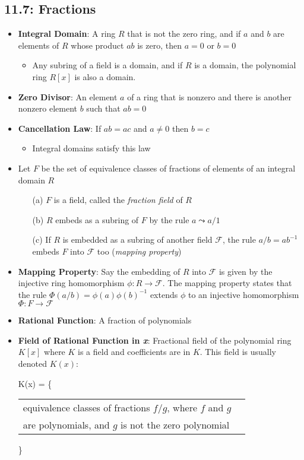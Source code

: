 \documentclass[12pt]{article}
\begin{document}
\subsection*{11.7: Fractions}
\begin{itemize}
  \item \textbf{Integral Domain}: A ring $R$ that is not the zero ring, and if $a$ and $b$ are elements of $R$ whose product $ab$ is zero, then $a = 0$ or $b = 0$
  \begin{itemize}
    \item Any subring of a field is a domain, and if $R$ is a domain, the polynomial ring $R[x]$ is also a domain.
  \end{itemize}
  \item \textbf{Zero Divisor}: An element $a$ of a ring that is nonzero and there is another nonzero element $b$ such that $ab = 0$
  \item \textbf{Cancellation Law}: If $ab = ac$ and $a \neq 0$ then $b = c$
  \begin{itemize}
    \item Integral domains satisfy this law
  \end{itemize}
  \item Let $F$ be the set of equivalence classes of fractions of elements of an integral domain $R$
  \begin{enumerate}
    \item[(a)] $F$ is a field, called the \textit{fraction field} of $R$
    \item[(b)] $R$ embeds as a subring of $F$ by the rule $a \leadsto a/1$
    \item[(c)] If $R$ is embedded as a subring of another field $\mathcal{F}$, the rule $a/b = ab^{-1}$ embeds $F$ into $\mathcal{F}$ too (\textit{mapping property})
  \end{enumerate}
  \item \textbf{Mapping Property}: Say the embedding of $R$ into $\mathcal{F}$ is given by the injective ring homomorphism $\phi: R \to \mathcal{F}$. The mapping property states that the rule $\Phi(a/b) = \phi(a)\phi(b)^{-1}$ extends $\phi$ to an injective homomorphism $\Phi: F \to \mathcal{F}$
  \item \textbf{Rational Function}: A fraction of polynomials
  \item \textbf{Field of Rational Function in \textit{x}}: Fractional field of the polynomial ring $K[x]$ where $K$ is a field and coefficients are in $K$. This field is usually denoted $K(x)$:
  \begin{center}
    K(x) = \left\{
      \begin{tabular}{ll}
        equivalence classes of fractions $f/g$, where $f$ and $g$ \\
        are polynomials, and $g$ is not the zero polynomial\\
      \end{tabular}
    \right\}
  \end{center}
\end{itemize}
\end{document}
